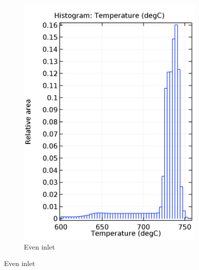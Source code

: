 \documentclass{elsarticle}
\begin{document}
\begin{figure}
\begin{subfigure}[b]{0.42\textwidth}
        \includegraphics[width=\textwidth]{images/diffusion/mk1/SS/flow_opti/hist_even.png}
        \caption{Even inlet}
    \end{subfigure}


\end{figure}
\end{document}
